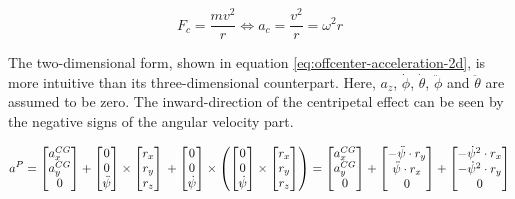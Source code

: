 \begin{equation}\label{eq:centripetal-acceleration}%
F_c = \frac{mv^2}{r} \iff a_c = \frac{v^2}{r} = \omega^2 r%
\end{equation}

The two-dimensional form, shown in equation \ref{eq:offcenter-acceleration-2d}, is more intuitive than its three-dimensional counterpart. Here, $a_z$, $\dot{\phi}$, $\dot{\theta}$, $\ddot{\phi}$ and $\ddot{\theta}$ are assumed to be zero. The inward-direction of the centripetal effect can be seen by the negative signs of the angular velocity part.

\begin{equation}\label{eq:offcenter-acceleration-2d}%
a^P%
= \begin{bmatrix}a_x^{CG} \\ a_y^{CG} \\ 0\end{bmatrix}%
+ \begin{bmatrix}0 \\0 \\ \ddot{\psi}\end{bmatrix} \times \begin{bmatrix}r_x \\ r_y \\ r_z\end{bmatrix} \\%
+ \begin{bmatrix}0 \\ 0 \\ \dot{\psi}\end{bmatrix} \times \left(\begin{bmatrix}0 \\ 0 \\ \dot{\psi}\end{bmatrix} \times \begin{bmatrix}r_x \\ r_y \\ r_z\end{bmatrix}\right)%
= \begin{bmatrix}a_x^{CG} \\ a_y^{CG} \\ 0\end{bmatrix}%
+ \begin{bmatrix}-\ddot{\psi} \cdot r_y \\ \ddot{\psi} \cdot r_x \\ 0\end{bmatrix}%
+ \begin{bmatrix}-\dot{\psi}^2 \cdot r_x \\ -\dot{\psi}^2 \cdot r_y \\ 0\end{bmatrix}%
\end{equation}

